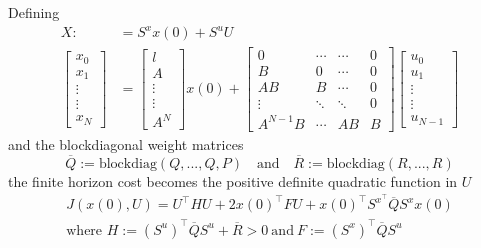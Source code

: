 \newpar{}

Defining
\noindent\begin{align*}
    X:                        & =S^x x(0)+S^u U \\
    \left.\left[
    \begin{array}
            {c}x_0 \\
            x_1    \\
            \vdots \\
            \vdots \\
            x_N
        \end{array}\right.\right] & =
    \begin{bmatrix}
        l      \\
        A      \\
        \vdots \\
        \vdots \\
        A^N
    \end{bmatrix}x(0)+
    \begin{bmatrix}
        0        & \cdots & \cdots & 0 \\
        B        & 0      & \cdots & 0 \\
        AB       & B      & \cdots & 0 \\
        \vdots   & \ddots & \ddots & 0 \\
        A^{N-1}B & \cdots & AB     & B
    \end{bmatrix}
    \begin{bmatrix}
        u_0    \\
        u_1    \\
        \vdots \\
        \vdots \\
        u_{N-1}
    \end{bmatrix}
\end{align*}
and the blockdiagonal weight matrices
\noindent\begin{equation*}
    \overline{Q}:=\mathrm{blockdiag}(Q,...,Q,P)\quad\mathrm{and}\quad\overline{R}:=\mathrm{blockdiag}(R,...,R)
\end{equation*}
the finite horizon cost becomes the positive definite quadratic function in $U$
\noindent\begin{gather*}
    J(x(0), U) =U^{\top}HU+2{x(0)}^{\top}FU+{x(0)}^{\top}S^{x^{\top}}\overline{Q}S^{x}x(0)\\
    \text{where } H:={(S^u)}^\top\overline{Q} S^u+\overline{R} > 0 \mathrm{~and~}F:={(S^x)}^\top\overline{Q} S^u
\end{gather*}

